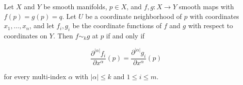 Let $X$ and $Y$ be smooth manifolds, $p \in X$, and $f, g: X \to Y$ smooth maps with $f(p) = g(p) = q$. Let $U$ be a coordinate neighborhood of $p$ with coordinates $x_1, \ldots, x_n$, and let $f_i, g_i$ be the coordinate functions of $f$ and $g$ with respect to coordinates on $Y$. Then $f \sim_k g$ at $p$ if and only if

$$\frac{\partial^{|\alpha|} f_i}{\partial x^\alpha}(p) = \frac{\partial^{|\alpha|} g_i}{\partial x^\alpha}(p)$$

for every multi-index $\alpha$ with $|\alpha| \leq k$ and $1 \leq i \leq m$.
